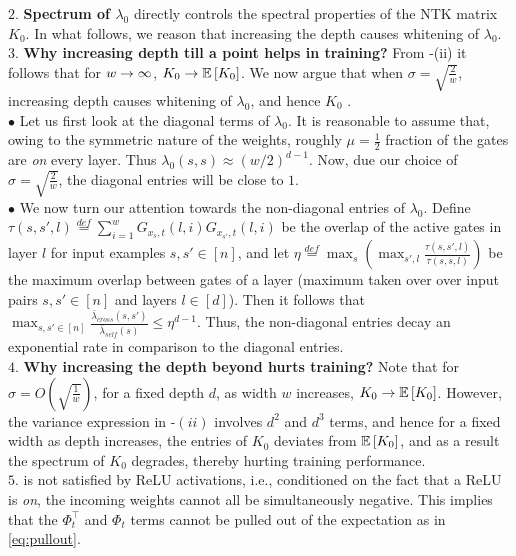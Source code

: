 $2.$ \textbf{Spectrum of $\lambda_0$} directly controls the spectral properties of the NTK matrix $K_0$. In what follows, we reason that increasing the depth causes whitening of $\lambda_0$.\\%
$3.$ \textbf{Why increasing depth till a point helps in training? } From -(ii) it follows that for $w\rightarrow\infty$, $K_0\rightarrow\mathbb{E}\left[K_0\right]$. We now argue that when $\sigma=\sqrt{\frac{2}{w}}$, increasing depth causes whitening of $\lambda_0$, and hence $K_0$ .\hfill\\
$\bullet$ Let us first look at the diagonal terms of $\lambda_0$. It is reasonable to assume that, owing to the symmetric nature of the weights, roughly $\mu=\frac{1}{2}$ fraction of the gates are \emph{on} every layer. Thus $\lambda_0(s,s)\approx (w/2)^{d-1}$. Now, due our choice of $\sigma=\sqrt{\frac{2}{w}}$, the diagonal entries will be close to $1$.\hfill\\
$\bullet$ We now turn our attention towards the non-diagonal entries of $\lambda_0$. Define $\tau(s,s',l)\stackrel{def}=\sum_{i=1}^w G_{x_s,t}(l,i)G_{x_{s'},t}(l,i)$ be the overlap of the active gates in layer $l$ for input examples $s,s'\in[n]$, and  let $\eta\stackrel{def}=\max_s\left(\max_{s',l} \frac{\tau(s,s',l)}{\tau(s,s,l)}\right)$ be the maximum overlap between gates of a layer (maximum taken over over input pairs $s,s'\in[n]$ and layers $l\in [d]$).  Then it follows that $\max_{s,s'\in [n]} \frac{\bar{\lambda}_{cross}(s,s')}{\bar{\lambda}_{self}(s)}\leq \eta^{d-1}$. Thus, the non-diagonal entries decay an exponential rate in comparison to the diagonal entries.\hfill\\
$4.$ \textbf{Why increasing the depth beyond hurts training?} Note that for $\sigma=O\left(\sqrt{\frac{1}{w}}\right)$, for a fixed depth $d$, as width $w$ increases, $K_0\rightarrow\mathbb{E}\left[K_0\right]$. However, the variance expression in -$(ii)$ involves $d^2$ and $d^3$ terms, and hence for a fixed width as depth increases, the entries of $K_0$ deviates from $\mathbb{E}\left[K_0\right]$, and as a result the spectrum of $K_0$ degrades, thereby hurting training performance.\\
$5.$  is not satisfied by ReLU activations, i.e., conditioned on the fact that a ReLU is \emph{on}, the incoming weights cannot all be simultaneously negative. This implies that the $\Phi^\top_t$ and $\Phi_t$ terms cannot be pulled out of the expectation as in \eqref{eq:pullout}.\\

